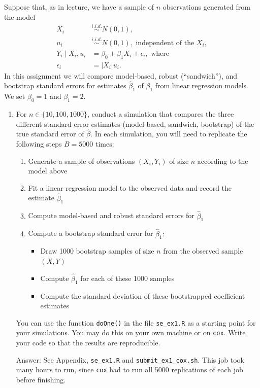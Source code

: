 \documentclass{article}
\newcommand{\abs}[1]{\left\lvert#1\right\rvert}
\begin{document}
Suppose that, as in lecture, we have a sample of $n$ observations generated from the model
\begin{align*}
X_i &\stackrel{i.i.d.}{\sim} N(0, 1), \\
u_i &\stackrel{i.i.d.}{\sim} N(0, 1), \text{ independent of the } X_i, \\
Y_i \mid X_i, u_i &= \beta_0 + \beta_1 X_i + \epsilon_i, \text{ where} \\
\epsilon_i &= \abs{X_i}u_i.
\end{align*}
In this assignment we will compare model-based, robust (``sandwich''), and bootstrap standard errors for estimates $\hat{\beta}_1$ of $\beta_1$ from linear regression models. We set $\beta_0 = 1$ and $\beta_1 = 2$.
\begin{enumerate}
\item For $n \in \{10, 100, 1000\}$, conduct a simulation that compares the three different standard error estimates (model-based, sandwich, bootstrap) of the true standard error of $\hat{\beta}$. In each simulation, you will need to replicate the following steps $B = 5000$ times:
\begin{enumerate}
\item Generate a sample of observations $(X_i, Y_i)$ of size $n$ according to the model above
\item Fit a linear regression model to the observed data and record the estimate $\hat{\beta}_1$
\item Compute model-based and robust standard errors for $\hat{\beta}_1$
\item Compute a bootstrap standard error for $\hat{\beta}_1:$ 
\begin{itemize}
\item Draw 1000 bootstrap samples of size $n$ from the observed sample $(X, Y)$
\item Compute $\hat{\beta}_1$ for each of these 1000 samples
\item Compute the standard deviation of these bootstrapped coefficient estimates
\end{itemize}
\end{enumerate}
You can use the function \texttt{doOne()} in the file \texttt{se\_ex1.R} as a starting point for your simulations. You may do this on your own machine or on \texttt{cox}. Write your code so that the results are reproducible.

\item[Answer:] See Appendix, \texttt{se\_ex1.R} and \texttt{submit\_ex1\_cox.sh}. This job took many hours to run, since \texttt{cox} had to run all 5000 replications of each job before finishing.


\end{enumerate}
\end{document}
